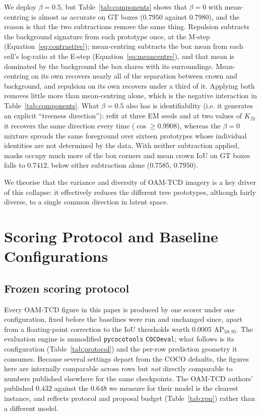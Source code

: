 \documentclass[remotesensing,article,submit,moreauthors]{Definitions/mdpi}
\begin{document}
We deploy $\beta = 0.5$, but Table~\ref{tab:components} shows that $\beta = 0$ with mean-centring is almost as accurate on GT boxes ($0.7950$ against $0.7980$), and the reason is that the two subtractions remove the same thing. Repulsion subtracts the background signature from each prototype once, at the M-step (Equation~\eqref{eq:contrastive}); mean-centring subtracts the box mean from each cell's log-ratio at the E-step (Equation~\eqref{eq:meancentre}), and that mean is dominated by the background the box shares with its surroundings. Mean-centring on its own recovers nearly all of the separation between crown and background, and repulsion on its own recovers under a third of it. Applying both removes little more than mean-centring alone, which is the negative interaction in Table~\ref{tab:components}.
What $\beta = 0.5$ also has is identifiability (i.e. it generates an explicit ``treeness direction''): refit at three EM seeds and at two values of $K_{fg}$ it recovers the same direction every time ($\cos \geq 0.9908$), whereas the $\beta = 0$ mixture spreads the same foreground over sixteen prototypes whose individual identities are not determined by the data. With neither subtraction applied, masks occupy much more of the box corners and mean crown IoU on GT boxes falls to $0.7412$, below either subtraction alone ($0.7585$, $0.7950$).

We theorise that the variance and diversity of OAM-TCD imagery is a key driver of this collapse: it effectively reduces the different tree prototypes, although fairly diverse, to a single common direction in latent space.

\section{Scoring Protocol and Baseline Configurations}
\label{app:protocol}

\subsection{Frozen scoring protocol}

Every OAM-TCD figure in this paper is produced by one scorer under one configuration, fixed before the baselines were run and unchanged since, apart from a floating-point correction to the IoU thresholds worth $0.0005$ AP$_{50:95}$. The evaluation engine is unmodified \texttt{pycocotools} \texttt{COCOeval}; what follows is its configuration (Table~\ref{tab:protocol}) and the per-row prediction geometry it consumes. Because several settings depart from the COCO defaults, the figures here are internally comparable across rows but \emph{not} directly comparable to numbers published elsewhere for the same checkpoints. The OAM-TCD authors' published $0.432$ against the $0.648$ we measure for their model is the clearest instance, and reflects protocol and proposal budget (Table~\ref{tab:rpn}) rather than a different model.
\end{document}
